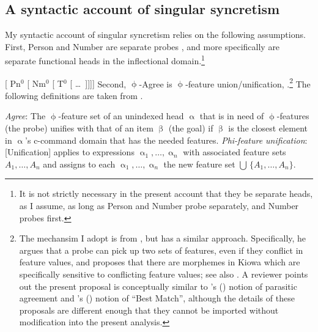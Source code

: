 \documentclass[output=paper]{langscibook}
\def\exattr#1{\hfill{} #1}
\begin{document}



\subsection{A syntactic account of singular \sti syncretism}	


My syntactic account of singular \sti syncretism relies on the following assumptions. First, Person and Number are separate probes \citep{SigurTHsson:2008dm,Bejar:2008sw}, and more specifically are separate functional heads in the inflectional domain.\footnote{It is not strictly necessary in the present account that they be separate heads, as I assume, as long as Person and Number probe separately, and Number probes first.}

\ea
    { [ Pn$^0$ [ Nm$^0$ [ T$^0$ [ \dots\ ]]]] }
\z
Second, $\upphi$-Agree is $\upphi$-feature union/unification, \citep{Kratzer:2009jq,Harbour:2009mh}.\footnote{The mechansim I adopt is from \citet{Kratzer:2009jq}, but \citet{Harbour:2009mh} has a similar approach. Specifically, he argues that a probe can pick up two sets of features, even if they conflict in feature values, and proposes that there are morphemes in Kiowa which are specifically sensitive to conflicting feature values; see also \citet{oxford2019inverse}. A reviewer points out the present proposal is conceptually similar to \citeauthor{kotek2014wh}'s (\citeyear{kotek2014wh})  notion of parasitic agreement and \citeauthor{vanUrk2015}'s (\citeyear{vanUrk2015}) notion of ``Best Match'', although the details of these proposals are different enough that they cannot be imported without modification into the present analysis.} The following definitions are taken from \citet{Kratzer:2009jq}.




\ea 
    \ea \textit{Agree}: The $\upphi$-feature set of an unindexed head $\upalpha$ that is in need of $\upphi $-features (the probe) unifies with that of an item $\upbeta$ (the goal) if $\upbeta$ is the closest element in $\upalpha$'s c-command domain that has the needed features. 
    \exattr{\mbox{\citep[197]{Kratzer:2009jq}}}%
    \ex \textit{Phi-feature unification}: [Unification] applies to expressions 
    $\upalpha_1, \dots, \upalpha_n$ with associated feature sets $A_1, \dots, A_n$ and 
    assigns to each $\upalpha_1, \dots, \upalpha_n$  the new feature set 
    $\bigcup\,\{A_1, \dots, A_n\}$.
    \exattr{\citep[195]{Kratzer:2009jq}} %
    \z
\z
\end{document}
